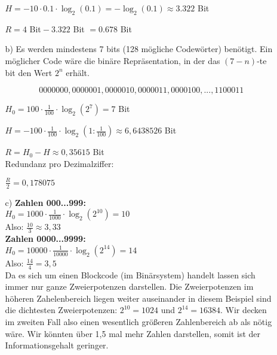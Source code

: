 \documentclass[a4paper,10pt]{scrartcl}
\begin{document}
\begin{enumerate}
\begin{enumerate}
                $H = - 10 \cdot 0.1 \cdot \log_2(0.1) = -\log_2(0.1) \approx 3.322$ Bit

                $R = 4$ Bit${}- 3.322$ Bit $= 0.678$ Bit

            \item[b)]
                Es werden mindestens 7 bits (128 mögliche Codewörter) benötigt. Ein möglicher
                Code wäre die binäre Repräsentation, in der das $(7-n)$-te bit den Wert $2^n$
                erhält.

                $$0000000, 0000001, 0000010, 0000011, 0000100, ..., 1100011$$
				

				$H_0 = 100 \cdot \frac{1}{100} \cdot \log_2(2^7) = 7 $ Bit

                $H = - 100 \cdot \frac{1}{100} \cdot \log_2(1: \frac{1}{100}) \approx 6,6438526$ Bit %
                
                $ R = H_0 - H \approx 0,35615$ Bit \\
              
                Redundanz pro Dezimalziffer:
                
                $\frac{R}{2}=0,178075$
                
                
            \item[c)]
				\textbf{Zahlen 000...999:}\\
					$H_0 = 1000 \cdot \frac{1}{1000} \cdot \log_2(2^{10}) = 10 $ \\
					Also: $\frac{10}{3} \approx 3,33$ \\
					
				\textbf{Zahlen 0000...9999:} \\
					$H_0 = 10000 \cdot \frac{1}{10000} \cdot \log_2(2^{14}) = 14 $ \\
					Also: $\frac{14}{4}=3,5$ \\
					Da es sich um einen Blockcode (im Binärsystem) handelt lassen sich immer nur ganze Zweierpotenzen darstellen.
					Die Zweierpotenzen im höheren Zahelenbereich liegen weiter auseinander in diesem Beispiel sind die dichtesten Zweierpotenzen: $2^{10}=1024$ und $2^{14}=16384$. 
					Wir decken im zweiten Fall also einen wesentlich größeren Zahlenbereich ab als nötig wäre. 
					Wir könnten über 1,5 mal mehr Zahlen darstellen, somit ist der Informationsgehalt geringer. 
					

\end{enumerate}
\end{enumerate}
\end{document}
